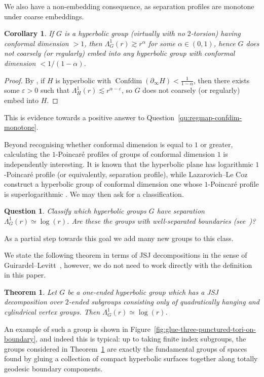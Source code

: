 \documentclass[11pt]{amsart}
\numberwithin{equation}{section}
\newtheorem{theorem}[equation]{Theorem}
\newtheorem{corollary}[equation]{Corollary}
\newtheorem{question}[equation]{Question}
\theoremstyle{citing}
\DeclareMathOperator{\Confdim}{Confdim}
\newcommand{\bdry}{\partial_\infty}
\numberwithin{equation}{section}
\begin{document}
We also have a non-embedding consequence, as separation profiles are monotone under coarse embeddings.
\begin{corollary}\label{cor:non-embed-confdim-close-to-1}
	If $G$ is a hyperbolic group (virtually with no $2$-torsion) having conformal dimension $>1$, then $\Lambda^1_G(r) \gtrsim r^{\alpha}$ for some $\alpha\in (0,1)$, hence $G$ does not coarsely (or regularly) embed into any hyperbolic group with conformal dimension $< 1/(1-\alpha)$.
\end{corollary}
\begin{proof}
	By \cite[Theorem 6.1]{HumeMackTess-PprofLie}, if $H$ is hyperbolic with $\Confdim(\bdry H) < \frac{1}{1-\alpha}$, then there exists some $\varepsilon>0$ such that $\Lambda_H^1(r) \lesssim r^{\alpha-\varepsilon}$, so $G$ does not coarsely (or regularly) embed into $H$.
\end{proof}
This is evidence towards a positive answer to Question~\ref{qu:regmap-confdim-monotone}.

Beyond recognising whether conformal dimension is equal to $1$ or greater, calculating the $1$-Poincar\'e profiles of groups of conformal dimension $1$ is independently interesting. It is known that the hyperbolic plane has logarithmic $1$-Poincar\'e profile (or equivalently, separation profile), while Lazarovich--Le Coz construct a hyperbolic group of conformal dimension one whose $1$-Poincar\'e profile is superlogarithmic \cite{Lazarovich-LeCoz-25}. We may then ask for a classification.
\begin{question}\label{qu:logsep}
	Classify which hyperbolic groups $G$ have separation $\Lambda_G^1(r) \simeq \log(r)$.
Are these the groups with well-separated boundaries (see~\cite{Carrasco14-WS-hyp-confdim1})?
\end{question}
As a partial step towards this goal we add many new groups to this class.

We state the following theorem in terms of JSJ decompositions in the sense of Guirardel--Levitt~\cite{GuirardelLevitt-17-JSJ}, however, we do not need to work directly with the definition in this paper.
\begin{theorem}\label{thm:logsep}
	Let $G$ be a one-ended hyperbolic group which has a JSJ decomposition over $2$-ended subgroups consisting only of quadratically hanging and cylindrical vertex groups.
	Then $\Lambda^1_{G}(r) \simeq \log(r)$.
\end{theorem}
	An example of such a group is shown in Figure~\ref{fig:glue-three-punctured-tori-on-boundary}, and indeed this is typical: up to taking finite index subgroups, the groups considered in Theorem~\ref{thm:logsep} are exactly the fundamental groups of spaces found by gluing a collection of compact hyperbolic surfaces together along totally geodesic boundary components.
\end{document}
